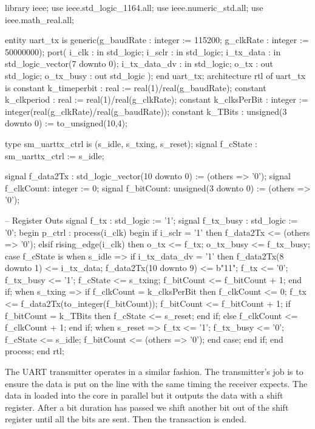 \begin{VHDLlisting}[tabsize=8]
library ieee;
  use ieee.std_logic_1164.all;
  use ieee.numeric_std.all;
  use ieee.math_real.all;
  
entity uart_tx is
  generic(g_baudRate : integer := 115200;
          g_clkRate  : integer := 50000000);
  port(
      i_clk        : in    std_logic;
      i_sclr       : in    std_logic;
      i_tx_data    : in    std_logic_vector(7 downto 0);
      i_tx_data_dv : in    std_logic;
      o_tx         :   out std_logic;
      o_tx_busy    :   out std_logic
      );
end uart_tx;
architecture rtl of uart_tx is 
  constant k_timeperbit : real := real(1)/real(g_baudRate);
  constant k_clkperiod  : real := real(1)/real(g_clkRate);
  constant k_clksPerBit : integer := integer(real(g_clkRate)/real(g_baudRate)); 
  constant k_TBits      : unsigned(3 downto 0) := to_unsigned(10,4);
  
  type sm_uarttx_ctrl is (s_idle, s_txing, s_reset);
  signal f_cState : sm_uarttx_ctrl := s_idle;
  
  signal f_data2Tx : std_logic_vector(10 downto 0) := (others => '0');
  signal f_clkCount: integer := 0;
  signal f_bitCount: unsigned(3 downto 0) := (others => '0');
  
  -- Register Outs
  signal f_tx : std_logic := '1';
  signal f_tx_busy : std_logic := '0';
begin
  p_ctrl : process(i_clk) 
  begin
    if i_sclr = '1' then
        f_data2Tx <= (others => '0');
    elsif rising_edge(i_clk) then
      o_tx <= f_tx;
      o_tx_busy <= f_tx_busy;
      case f_cState is  
        when s_idle =>
          if i_tx_data_dv = '1' then
            f_data2Tx(8 downto 1) <= i_tx_data;
            f_data2Tx(10 downto 9) <= b"11";
            f_tx <= '0';
            f_tx_busy <= '1';
            f_cState <= s_txing;
            f_bitCount <= f_bitCount + 1;
          end if;
        when s_txing => 
          if f_clkCount = k_clksPerBit then
            f_clkCount <= 0;
            f_tx <= f_data2Tx(to_integer(f_bitCount));
            f_bitCount <= f_bitCount + 1;
            if f_bitCount = k_TBits then
              f_cState <= s_reset;
            end if;
          else
            f_clkCount <= f_clkCount + 1;
          end if;
        when s_reset => 
          f_tx <= '1';
          f_tx_busy <= '0';
          f_cState <= s_idle;
          f_bitCount <= (others => '0');
      end case;
    end if;
  end process;
end rtl;
\end{VHDLlisting}
	
The \ac{UART} transmitter operates in a similar fashion. The transmitter's job is to ensure the data is put on the line with the same timing the receiver expects. The data in loaded into the core in parallel but it outputs the data with a shift register. After a bit duration has passed we shift another bit out of the shift register until all the bits are sent. Then the transaction is ended.
	

